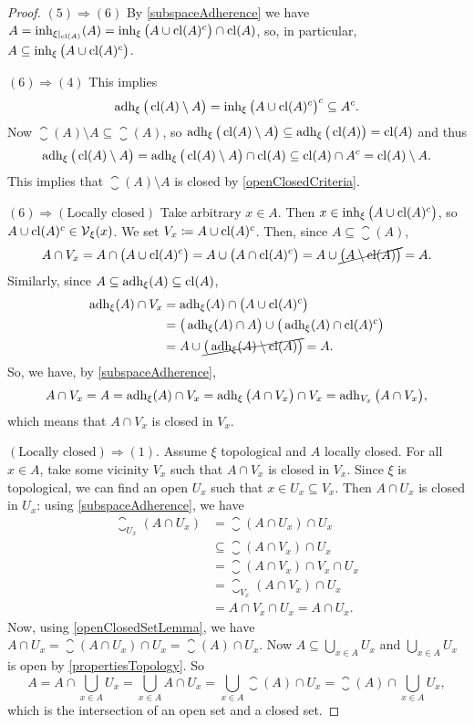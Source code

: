 \begin{proof}
$(5) \Rightarrow (6)$ By \ref{subspaceAdherence} we have $A = \operatorname{inh}_{\xi|_{\operatorname{cl}(A)}}(A) = \operatorname{inh}_\xi\big(A \cup \operatorname{cl}(A)^c\big) \cap \operatorname{cl}(A)$, so, in particular, $A \subseteq \operatorname{inh}_\xi\big(A \cup \operatorname{cl}(A)^c\big)$.

$(6) \Rightarrow (4)$ This implies
\[ \operatorname{adh}_\xi\big(\operatorname{cl}(A)\setminus A\big) = \operatorname{inh}_\xi\big(A \cup \operatorname{cl}(A)^c\big)^c \subseteq A^c. \]
Now $\closure(A)\setminus A \subseteq \closure(A)$, so $\operatorname{adh}_\xi\big(\operatorname{cl}(A)\setminus A\big) \subseteq \operatorname{adh}_\xi\big(\operatorname{cl}(A)\big) = \operatorname{cl}(A)$ and thus
\[ \operatorname{adh}_\xi\big(\operatorname{cl}(A)\setminus A\big) = \operatorname{adh}_\xi\big(\operatorname{cl}(A)\setminus A\big) \cap \operatorname{cl}(A) \subseteq \operatorname{cl}(A) \cap A^c = \operatorname{cl}(A)\setminus A. \]
This implies that $\closure(A) \setminus A$ is closed by \ref{openClosedCriteria}.


$(6) \Rightarrow (\text{Locally closed})$ Take arbitrary $x\in A$. Then $x\in \operatorname{inh}_\xi\big(A \cup \operatorname{cl}(A)^c\big)$, so $A\cup \operatorname{cl}(A)^c \in \operatorname{\mathcal{V}}_\xi(x)$. We set $V_x \coloneqq A\cup \operatorname{cl}(A)^c$. Then, since $A\subseteq \closure(A)$,
\[ A\cap V_x = A\cap \big(A \cup \operatorname{cl}(A)^c\big) = A \cup \big(A \cap \operatorname{cl}(A)^c\big) = A \cup \cancel{\big(A \setminus \operatorname{cl}(A)\big)} = A. \]
Similarly, since $A\subseteq \operatorname{adh}_\xi(A)\subseteq \operatorname{cl}(A)$,
\begin{align*}
\operatorname{adh}_\xi(A)\cap V_x &= \operatorname{adh}_\xi(A)\cap \big(A \cup \operatorname{cl}(A)^c\big) \\
&= \big(\operatorname{adh}_\xi(A) \cap A\big) \cup \big(\operatorname{adh}_\xi(A) \cap \operatorname{cl}(A)^c\big) \\
&= A \cup \cancel{\big(\operatorname{adh}_\xi(A) \setminus \operatorname{cl}(A)\big)} = A.
\end{align*}
So, we have, by \ref{subspaceAdherence},
\[ A\cap V_x = A = \operatorname{adh}_\xi(A)\cap V_x = \operatorname{adh}_\xi\big(A\cap V_x\big)\cap V_x = \operatorname{adh}_{V_x}\big(A\cap V_x\big), \]
which means that $A\cap V_x$ is closed in $V_x$.

$(\text{Locally closed}) \Rightarrow (1)$. Assume $\xi$ topological and $A$ locally closed. For all $x\in A$, take some vicinity $V_x$ such that $A\cap V_x$ is closed in $V_x$. Since $\xi$ is topological, we can find an open $U_x$ such that $x\in U_x\subseteq V_x$. Then $A\cap U_x$ is closed in $U_x$: using \ref{subspaceAdherence}, we have
\begin{align*}
\closure_{U_x}(A\cap U_x) &= \closure(A\cap U_x) \cap U_x \\
&\subseteq \closure(A\cap V_x) \cap U_x \\
&= \closure(A\cap V_x) \cap V_x \cap U_x \\
&= \closure_{V_x}(A\cap V_x) \cap U_x \\
&= A\cap V_x \cap U_x = A \cap U_x.
\end{align*}
Now, using \ref{openClosedSetLemma}, we have $A \cap U_x = \closure(A\cap U_x) \cap U_x = \closure(A) \cap U_x$. Now $A\subseteq \bigcup_{x\in A}U_x$ and $\bigcup_{x\in A}U_x$ is open by \ref{propertiesTopology}. So
\[ A = A\cap \bigcup_{x\in A}U_x = \bigcup_{x\in A}A\cap U_x = \bigcup_{x\in A}\closure(A)\cap U_x = \closure(A) \cap \bigcup_{x\in A}U_x, \]
which is the intersection of an open set and a closed set.
\end{proof}

